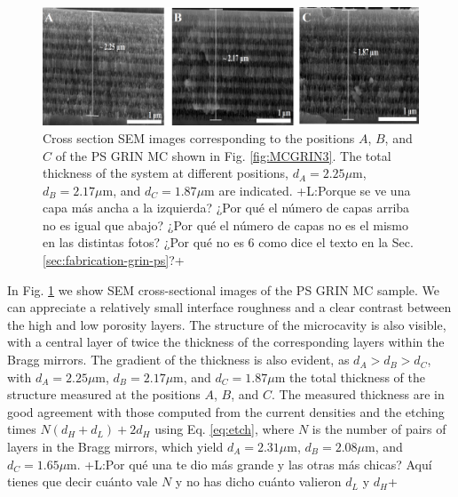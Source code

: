\documentclass{article}
\newcommand{\notaL}[1]{{\color{blue}+L:#1+}}
\begin{document}
 \begin{figure}
   \centering
   \includegraphics[width=\textwidth]{Images/MCGRINSEM}
   \caption{Cross section SEM images corresponding to the positions
     $A$, $B$, and $C$ of the PS GRIN MC shown in
     Fig. \ref{fig:MCGRIN3}. The total thickness of the system at
     different positions, $d_A=2.25\mu\text{m}$,
     $d_B=2.17\mu\text{m}$, and $d_C=1.87\mu\text{m}$ are
     indicated. \notaL{Porque se ve una capa más ancha a la izquierda?
       ¿Por qué el número de capas arriba no es igual que abajo? ¿Por
       qué el número de capas no es el mismo en las distintas fotos?
       ¿Por qué no es 6 como dice el texto en la
       Sec. \ref{sec:fabrication-grin-ps}?}
     }
   \label{fig:MCGRIN4}
 \end{figure}
In Fig. \ref{fig:MCGRIN4} we show SEM cross-sectional images of
the PS GRIN MC sample. We can appreciate a relatively small interface
roughness and a clear contrast between the high and low porosity
layers. The structure of the microcavity is also visible, with a
central layer of twice the thickness of the corresponding layers
within the Bragg mirrors. The gradient of the thickness is also
evident, as $d_A>d_B>d_C$, with $d_A=2.25\mu\text{m}$,
$d_B=2.17\mu\text{m}$, and $d_C=1.87\mu\text{m}$ the total thickness
of the structure measured at the positions $A$, $B$, and $C$.
The measured thickness are in good agreement with those computed from
the current densities and the etching times $N(d_H+d_L)+2 d_H$ using
Eq. \eqref{eq:etch}, where $N$ is the number of pairs of layers in the
Bragg mirrors, which yield $d_A=2.31\mu\text{m}$,
$d_B=2.08\mu\text{m}$, and $d_C=1.65\mu\text{m}$. \notaL{Por qué una
  te dio más grande y las otras más chicas? Aquí tienes que decir
  cuánto vale $N$ y no has dicho cuánto valieron $d_L$ y $d_H$}
\end{document}
